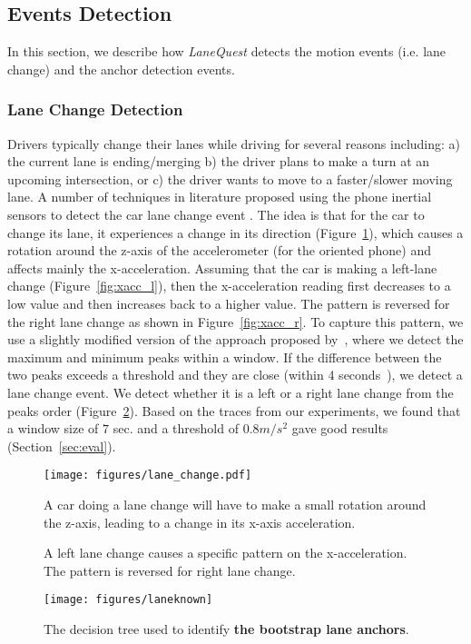 \documentclass[10pt, conference, compsocconf]{IEEEtran}
\def \sys {\textit{LaneQuest}}
\begin{document}
\subsection{Events Detection}\label{sec:event_detect}
In this section, we describe how \sys{} detects the motion events (i.e. lane change) and the anchor detection events.
\subsubsection{Lane Change Detection}\label{subsec:lane_change_det}
Drivers typically change their lanes while driving for several reasons including: a) the current lane is ending/merging b) the driver plans to make a turn at an upcoming intersection, or c) the driver wants to move to a faster/slower moving lane. A number of techniques in literature proposed using the phone inertial sensors to detect the car lane change event \cite{fazeen2012safe,li2012marvel}. The idea is that for the car to change its lane, it experiences a change in its direction (Figure~\ref{fig:lane_change_ex}), which causes a rotation around the z-axis of the accelerometer (for the oriented phone) and affects mainly the x-acceleration\cite{serway2013physics}. Assuming that the car is making a left-lane change (Figure~\ref{fig:xacc_l}), then the x-acceleration reading first decreases to a low value and then increases back to a higher value. The pattern is reversed for the right lane change as shown in Figure~\ref{fig:xacc_r}. To capture this pattern, we use a slightly modified version of the approach proposed by~\cite{li2012marvel}, where we detect the maximum and minimum peaks within a window. If the difference between the two peaks exceeds a threshold and they are close (within 4 seconds~\cite{li2012marvel}), we detect a lane change event. We detect whether it is a left or a right lane change from the peaks order (Figure~\ref{fig:lane_change}). Based on the traces from our experiments, we found that a window size of $7$ sec. and a threshold of $0.8 m/s^2$ gave good results (Section~\ref{sec:eval}).
\begin{figure}[!t]
\centering
\texttt{[image: figures/lane\_change.pdf]}
\caption{A car doing a lane change will have to make a small rotation around the z-axis, leading to a change in its x-axis acceleration.}
\label{fig:lane_change_ex}
\end{figure}
   \begin{figure}[!t]
    \centering
    \hspace{2pt}
\caption{A left lane change causes a specific pattern on the x-acceleration. The pattern is reversed for right lane change.}
\label{fig:lane_change}
\end{figure}
\begin{figure*}[!t]
\centering
\texttt{[image: figures/laneknown]}
\caption{The decision tree used to identify \textbf{the bootstrap lane anchors}.}
\label{fig:laneknown}
\end{figure*}
\end{document}
